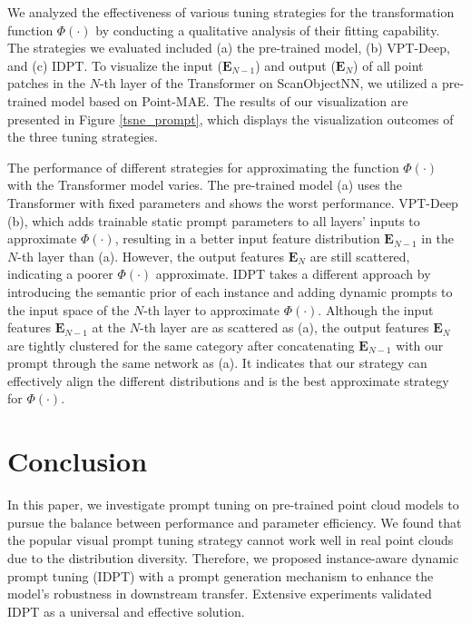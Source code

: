 \documentclass[10pt,twocolumn,letterpaper]{article}
\begin{document}
We analyzed the effectiveness of various tuning strategies for the transformation function $\Phi(\cdot)$ by conducting a qualitative analysis of their fitting capability. The strategies we evaluated included (a) the pre-trained model, (b) VPT-Deep, and (c) IDPT. To visualize the input ($\bm E_{N-1}$) and output ($\bm E_{N}$) of all point patches in the $N$-th layer of the Transformer on ScanObjectNN, we utilized a pre-trained model based on Point-MAE. The results of our visualization are presented in Figure \ref{tsne_prompt}, which displays the visualization outcomes of the three tuning strategies.


The performance of different strategies for approximating the function $\Phi(\cdot)$ with the Transformer model varies. The pre-trained model (a) uses the Transformer with fixed parameters and shows the worst performance. VPT-Deep (b), which adds trainable static prompt parameters to all layers' inputs to approximate $\Phi(\cdot)$, resulting in a better input feature distribution $\bm E_{N-1}$ in the $N$-th layer than (a). However, the output features $\bm E_{N}$ are still scattered, indicating a poorer $\Phi(\cdot)$ approximate. IDPT takes a different approach by introducing the semantic prior of each instance and adding dynamic prompts to the input space of the $N$-th layer to approximate $\Phi(\cdot)$. Although the input features $\bm E_{N-1}$ at the $N$-th layer are as scattered as (a), the output features $\bm E_{N}$ are tightly clustered for the same category after concatenating $\bm E_{N-1}$ with our prompt through the same network as (a). It indicates that our strategy can effectively align the different distributions and is the best approximate strategy for $\Phi(\cdot)$.


\section{Conclusion}

In this paper, we investigate prompt tuning on pre-trained point cloud models to pursue the balance between performance and parameter efficiency. We found that the popular visual prompt tuning strategy cannot work well in real point clouds due to the distribution diversity. Therefore, we proposed instance-aware dynamic prompt tuning (IDPT) with a prompt generation mechanism to enhance the model's robustness in downstream transfer. Extensive experiments validated IDPT as a universal and effective solution.


\balance
{\small


}
\end{document}
